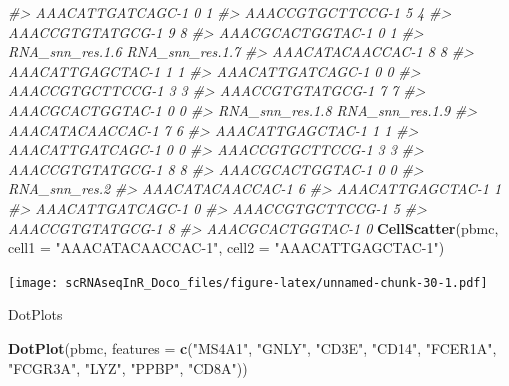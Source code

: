 \documentclass[
]{book}
\newenvironment{Shaded}{\begin{snugshade}}{\end{snugshade}}
\newcommand{\AttributeTok}[1]{\textcolor[rgb]{0.13,0.29,0.53}{#1}}
\newcommand{\CommentTok}[1]{\textcolor[rgb]{0.56,0.35,0.01}{\textit{#1}}}
\newcommand{\FunctionTok}[1]{\textcolor[rgb]{0.13,0.29,0.53}{\textbf{#1}}}
\newcommand{\NormalTok}[1]{#1}
\newcommand{\StringTok}[1]{\textcolor[rgb]{0.31,0.60,0.02}{#1}}
\begin{document}
\begin{Shaded}
\begin{Highlighting}[]
\CommentTok{\#\textgreater{} AAACATTGATCAGC{-}1               0               1}
\CommentTok{\#\textgreater{} AAACCGTGCTTCCG{-}1               5               4}
\CommentTok{\#\textgreater{} AAACCGTGTATGCG{-}1               9               8}
\CommentTok{\#\textgreater{} AAACGCACTGGTAC{-}1               0               1}
\CommentTok{\#\textgreater{}                  RNA\_snn\_res.1.6 RNA\_snn\_res.1.7}
\CommentTok{\#\textgreater{} AAACATACAACCAC{-}1               8               8}
\CommentTok{\#\textgreater{} AAACATTGAGCTAC{-}1               1               1}
\CommentTok{\#\textgreater{} AAACATTGATCAGC{-}1               0               0}
\CommentTok{\#\textgreater{} AAACCGTGCTTCCG{-}1               3               3}
\CommentTok{\#\textgreater{} AAACCGTGTATGCG{-}1               7               7}
\CommentTok{\#\textgreater{} AAACGCACTGGTAC{-}1               0               0}
\CommentTok{\#\textgreater{}                  RNA\_snn\_res.1.8 RNA\_snn\_res.1.9}
\CommentTok{\#\textgreater{} AAACATACAACCAC{-}1               7               6}
\CommentTok{\#\textgreater{} AAACATTGAGCTAC{-}1               1               1}
\CommentTok{\#\textgreater{} AAACATTGATCAGC{-}1               0               0}
\CommentTok{\#\textgreater{} AAACCGTGCTTCCG{-}1               3               3}
\CommentTok{\#\textgreater{} AAACCGTGTATGCG{-}1               8               8}
\CommentTok{\#\textgreater{} AAACGCACTGGTAC{-}1               0               0}
\CommentTok{\#\textgreater{}                  RNA\_snn\_res.2}
\CommentTok{\#\textgreater{} AAACATACAACCAC{-}1             6}
\CommentTok{\#\textgreater{} AAACATTGAGCTAC{-}1             1}
\CommentTok{\#\textgreater{} AAACATTGATCAGC{-}1             0}
\CommentTok{\#\textgreater{} AAACCGTGCTTCCG{-}1             5}
\CommentTok{\#\textgreater{} AAACCGTGTATGCG{-}1             8}
\CommentTok{\#\textgreater{} AAACGCACTGGTAC{-}1             0}
\FunctionTok{CellScatter}\NormalTok{(pbmc, }\AttributeTok{cell1 =} \StringTok{"AAACATACAACCAC{-}1"}\NormalTok{, }\AttributeTok{cell2 =} \StringTok{"AAACATTGAGCTAC{-}1"}\NormalTok{)}
\end{Highlighting}
\end{Shaded}

\texttt{[image: scRNAseqInR\_Doco\_files/figure-latex/unnamed-chunk-30-1.pdf]}

DotPlots

\begin{Shaded}
\begin{Highlighting}[]
\FunctionTok{DotPlot}\NormalTok{(pbmc, }\AttributeTok{features =} \FunctionTok{c}\NormalTok{(}\StringTok{"MS4A1"}\NormalTok{, }\StringTok{"GNLY"}\NormalTok{, }\StringTok{"CD3E"}\NormalTok{, }\StringTok{"CD14"}\NormalTok{, }\StringTok{"FCER1A"}\NormalTok{, }\StringTok{"FCGR3A"}\NormalTok{, }\StringTok{"LYZ"}\NormalTok{, }\StringTok{"PPBP"}\NormalTok{, }\StringTok{"CD8A"}\NormalTok{))}
\end{Highlighting}
\end{Shaded}
\end{document}
